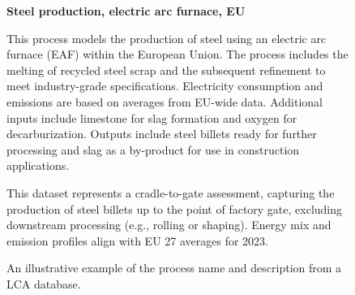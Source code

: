 \begin{figure}[h!]

\sffamily

\begin{custommdframed}


\textbf{Steel production, electric arc furnace, EU} 

\vspace{0.3em}
This process models the production of steel using an electric arc furnace (EAF) within the European Union. The process includes the melting of recycled steel scrap and the subsequent refinement to meet industry-grade specifications. Electricity consumption and emissions are based on averages from EU-wide data. Additional inputs include limestone for slag formation and oxygen for decarburization. Outputs include steel billets ready for further processing and slag as a by-product for use in construction applications.

This dataset represents a cradle-to-gate assessment, capturing the production of steel billets up to the point of factory gate, excluding downstream processing (e.g., rolling or shaping). Energy mix and emission profiles align with EU 27 averages for 2023.
\end{custommdframed}
\rmfamily
\caption{An illustrative example of the process name and description from a LCA database.}
\label{entry}

\end{figure}
